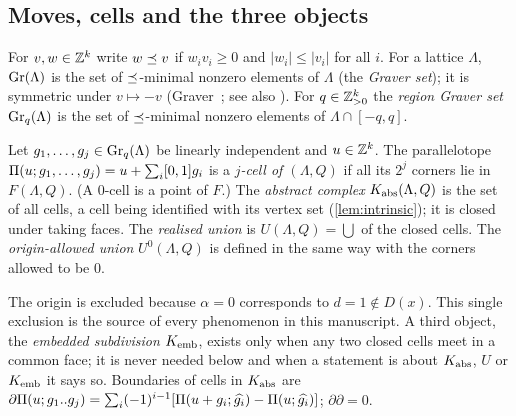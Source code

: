 \subsection{Moves, cells and the three objects}
\begin{definition}
For $v,w\in\mathbb Z^k$ write $w\preceq v$ if $w_iv_i\ge0$ and $|w_i|\le|v_i|$ for all $i$. For a lattice $\Lambda$, $\operatorname{Gr}(\Lambda)$ is the set of $\preceq$-minimal nonzero elements of $\Lambda$ (the \emph{Graver set}); it is symmetric under $v\mapsto-v$ (Graver~\cite{Graver1975}; see also \cite{Sturmfels1996,DLHK2013}). For $q\in\mathbb Z_{>0}^k$ the \emph{region Graver set} $\operatorname{Gr}_q(\Lambda)$ is the set of $\preceq$-minimal nonzero elements of $\Lambda\cap[-q,q]$.
\end{definition}
\begin{definition}[cell]\label{def:cell}
Let $g_1,\dots,g_j\in\operatorname{Gr}_q(\Lambda)$ be linearly independent and $u\in\mathbb Z^k$. The parallelotope $\Pi(u;g_1,\dots,g_j)=u+\sum_i[0,1]g_i$ is a \emph{$j$-cell of $(\Lambda,Q)$} if all its $2^j$ corners lie in $F(\Lambda,Q)$. (A $0$-cell is a point of $F$.) The \emph{abstract complex} $K_{\mathrm{abs}}(\Lambda,Q)$ is the set of all cells, a cell being identified with its vertex set (\cref{lem:intrinsic}); it is closed under taking faces. The \emph{realised union} is $U(\Lambda,Q)=\bigcup$ of the closed cells. The \emph{origin-allowed union} $U^0(\Lambda,Q)$ is defined in the same way with the corners allowed to be $0$.
\end{definition}
The origin is excluded because $\alpha=0$ corresponds to $d=1\notin D(x)$. This single exclusion is the source of every phenomenon in this manuscript. A third object, the \emph{embedded subdivision} $K_{\mathrm{emb}}$, exists only when any two closed cells meet in a common face; it is never needed below and when a statement is about $K_{\mathrm{abs}}$, $U$ or $K_{\mathrm{emb}}$ it says so. Boundaries of cells in $K_{\mathrm{abs}}$ are $\partial\Pi(u;g_1..g_j)=\sum_i(-1)^{i-1}[\Pi(u+g_i;\widehat{g_i})-\Pi(u;\widehat{g_i})]$; $\partial\partial=0$.


